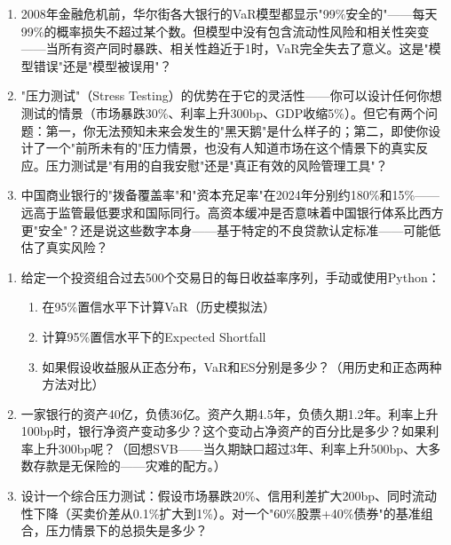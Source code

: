 \documentclass[a4paper,11pt]{ctexbook}
\begin{document}
\begin{discuss}
\begin{enumerate}
  \item 2008年金融危机前，华尔街各大银行的VaR模型都显示"99\%安全的"——每天99\%的概率损失不超过某个数。但模型中没有包含流动性风险和相关性突变——当所有资产同时暴跌、相关性趋近于1时，VaR完全失去了意义。这是"模型错误"还是"模型被误用"？
  \item "压力测试"（Stress Testing）的优势在于它的灵活性——你可以设计任何你想测试的情景（市场暴跌30\%、利率上升300bp、GDP收缩5\%）。但它有两个问题：第一，你无法预知未来会发生的"黑天鹅"是什么样子的；第二，即使你设计了一个"前所未有的"压力情景，也没有人知道市场在这个情景下的真实反应。压力测试是"有用的自我安慰"还是"真正有效的风险管理工具"？
  \item 中国商业银行的"拨备覆盖率"和"资本充足率"在2024年分别约180\%和15\%——远高于监管最低要求和国际同行。高资本缓冲是否意味着中国银行体系比西方更"安全"？还是说这些数字本身——基于特定的不良贷款认定标准——可能低估了真实风险？
\end{enumerate}
\end{discuss}

\begin{exercises}
\begin{enumerate}
  \item 给定一个投资组合过去500个交易日的每日收益率序列，手动或使用Python：
  \begin{enumerate}
    \item 在95\%置信水平下计算VaR（历史模拟法）
    \item 计算95\%置信水平下的Expected Shortfall
    \item 如果假设收益服从正态分布，VaR和ES分别是多少？（用历史和正态两种方法对比）
  \end{enumerate}
  \item 一家银行的资产40亿，负债36亿。资产久期4.5年，负债久期1.2年。利率上升100bp时，银行净资产变动多少？这个变动占净资产的百分比是多少？如果利率上升300bp呢？（回想SVB——当久期缺口超过3年、利率上升500bp、大多数存款是无保险的——灾难的配方。）
  \item 设计一个综合压力测试：假设市场暴跌20\%、信用利差扩大200bp、同时流动性下降（买卖价差从0.1\%扩大到1\%）。对一个"60\%股票+40\%债券"的基准组合，压力情景下的总损失是多少？
\end{enumerate}
\end{exercises}
\end{document}
